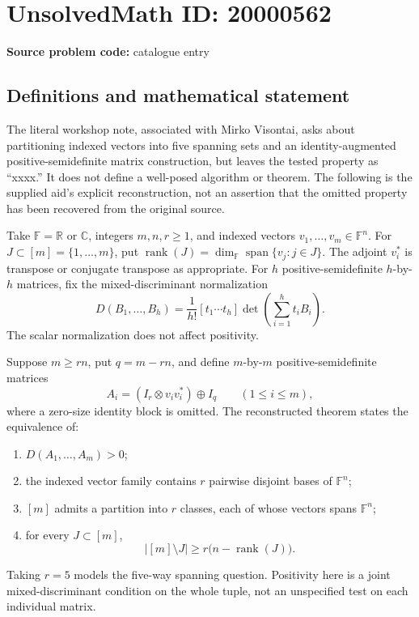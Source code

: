 \documentclass[11pt]{article}
\newcommand{\R}{\mathbb{R}}
\newcommand{\C}{\mathbb{C}}
\begin{document}
\section*{UnsolvedMath ID: 20000562}
\textbf{Source problem code:} catalogue entry
\subsection{Definitions and mathematical statement}
The literal workshop note, associated with Mirko Visontai, asks about partitioning indexed vectors into five spanning sets and an identity-augmented positive-semidefinite matrix construction, but leaves the tested property as ``xxxx.'' It does not define a well-posed algorithm or theorem. The following is the supplied aid's explicit reconstruction, not an assertion that the omitted property has been recovered from the original source.

Take \(\mathbb F=\R\) or \(\C\), integers \(m,n,r\geq1\), and indexed vectors \(v_1,\ldots,v_m\in\mathbb F^n\). For \(J\subset[m]=\{1,\ldots,m\}\), put \(\operatorname{rank}(J)=\dim_{\mathbb F}\operatorname{span}\{v_j:j\in J\}\). The adjoint \(v_i^*\) is transpose or conjugate transpose as appropriate. For \(h\) positive-semidefinite \(h\)-by-\(h\) matrices, fix the mixed-discriminant normalization
\[
 D(B_1,\ldots,B_h)=\frac1{h!}
 [t_1\cdots t_h]\det\!\left(\sum_{i=1}^h t_iB_i\right).
\]
The scalar normalization does not affect positivity.

Suppose \(m\geq rn\), put \(q=m-rn\), and define \(m\)-by-\(m\) positive-semidefinite matrices
\[
 A_i=(I_r\otimes v_iv_i^*)\oplus I_q\qquad(1\leq i\leq m),
\]
where a zero-size identity block is omitted. The reconstructed theorem states the equivalence of:
\begin{enumerate}
\item \(D(A_1,\ldots,A_m)>0\);
\item the indexed vector family contains \(r\) pairwise disjoint bases of \(\mathbb F^n\);
\item \([m]\) admits a partition into \(r\) classes, each of whose vectors spans \(\mathbb F^n\);
\item for every \(J\subset[m]\),
\[
 |[m]\setminus J|\geq r\bigl(n-\operatorname{rank}(J)\bigr).
\]
\end{enumerate}
Taking \(r=5\) models the five-way spanning question. Positivity here is a joint mixed-discriminant condition on the whole tuple, not an unspecified test on each individual matrix.
\end{document}
